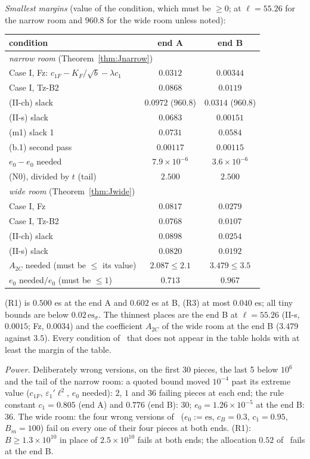 \emph{Smallest margins} (value of the condition, which must be $\ge0$; at $\ell=55.26$ for the narrow room and $960.8$ for the wide room unless noted):
\begin{center}
\footnotesize
\begin{tabular}{p{}cc}
condition & end A & end B\\ \hline
\multicolumn{3}{l}{\emph{narrow room} (Theorem~\ref{thm:Jnarrow})}\\
Case I, Fz: $c_{1F}-K_F/\sqrt b-\lambda c_1$ & $0.0312$ & $0.00344$\\
Case I, Tz-B2 & $0.0868$ & $0.0119$\\
(II-ch) slack & $0.0972$ ($960.8$) & $0.0314$ ($960.8$)\\
(II-s) slack & $0.0683$ & $0.00151$\\
(m1) slack 1 & $0.0731$ & $0.0584$\\
(b.1) second pass & $0.00117$ & $0.00115$\\
$e_0-e_0$ needed & $7.9\times10^{-6}$ & $3.6\times10^{-6}$\\
(N0), divided by $t$ (tail) & $2.500$ & $2.500$\\
\multicolumn{3}{l}{\emph{wide room} (Theorem~\ref{thm:Jwide})}\\
Case I, Fz & $0.0817$ & $0.0279$\\
Case I, Tz-B2 & $0.0768$ & $0.0107$\\
(II-ch) slack & $0.0898$ & $0.0254$\\
(II-s) slack & $0.0820$ & $0.0192$\\
$A_{2C}$ needed (must be $\le$ its value) & $2.087\le2.1$ & $3.479\le3.5$\\
$e_0$ needed$/e_0$ (must be $\le1$) & $0.713$ & $0.967$\\
\end{tabular}
\end{center}
(R1) is $0.500$ es at the end A and $0.602$ es at B, (R3) at most $0.040$ es; all tiny bounds are below $0.02\,\mathrm{es}_\sigma$.
The thinnest places are the end B at $\ell=55.26$ (II-s, $0.0015$; Fz, $0.0034$) and the coefficient $A_{2C}$ of the wide room at the end B ($3.479$ against $3.5$).
Every condition of~\cite{I} that does not appear in the table holds with at least the margin of the table.

\emph{Power.}
Deliberately wrong versions, on the first 30 pieces, the last 5 below $10^6$ and the tail of the narrow room: a quoted bound moved $10^{-4}$ past its extreme value ($c_{1F}$, $\varepsilon_1'\ell^2$, $e_0$ needed): $2$, $1$ and $36$ failing pieces at each end; the rule constant $c_1=0.805$ (end A) and $0.776$ (end B): $30$; $e_0=1.26\times10^{-5}$ at the end B: $36$.
The wide room: the four wrong versions of~\cite{I} ($e_0:=\mathrm{es}$, $c_B=0.3$, $c_1=0.95$, $B_m=100$) fail on every one of their four pieces at both ends.
(R1): $B\ge1.3\times10^{10}$ in place of $2.5\times10^{10}$ fails at both ends; the allocation $0.52$ of~\cite{I} fails at the end B.

